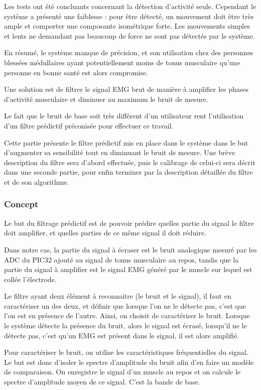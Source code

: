 \documentclass[letterpaper, twoside, 12pt, memoire, creativecommons, hyperref]{thETS}
\begin{document}
Les tests ont été concluants concernant la détection d'activité seule. Cependant le système a présenté une faiblesse : pour être détecté, un mouvement doit être très ample et comporter une composante isométrique forte. Les mouvements simples et lents ne demandant pas beaucoup de force ne sont pas détectés par le système. 

En résumé, le système manque de précision, et son utilisation chez des personnes blessées médullaires ayant potentiellement moins de tonus musculaire qu'une personne en bonne santé est alors compromise. 

Une solution est de filtrer le signal EMG brut de manière à amplifier les phases d'activité musculaire et diminuer au maximum le bruit de mesure. 

Le fait que le bruit de base soit très différent d'un utilisateur rent l'utilisation d'un filtre prédictif préconisée pour effectuer ce travail. 

Cette partie présente le filtre prédictif mis en place dans le système dans le but d'augmenter sa sensibilité tout en diminuant le bruit de mesure. Une brève description du filtre sera d'abord effectuée, puis le calibrage de celui-ci sera décrit dans une seconde partie, pour enfin terminer par la description détaillée du filtre et de son algorithme.

\subsubsection{Concept}

Le but du filtrage prédictif est de pouvoir prédire quelles partie du signal le filtre doit amplifier, et quelles parties de ce même signal il doit réduire.

Dans notre cas, la partie du signal à écraser est le bruit analogique mesuré par les ADC du PIC32 ajouté au signal de tonus musculaire au repos, tandis que la partie du signal à amplifier est le signal EMG généré par le muscle sur lequel est collée l'électrode.

Le filtre ayant deux élément à reconnaitre (le bruit et le signal), il faut en caractériser un des deux, et définir que lorsque l'on ne le détecte pas, c'est que l'on est en présence de l'autre. Ainsi, on choisit de caractériser le bruit. Lorsque le système détecte la présence du bruit, alors le signal est écrasé, lorsqu'il ne le détecte pas, c'est qu'un EMG est présent dans le signal, il est alors amplifié.

Pour caractériser le bruit, on utilise les caractéristiques fréquentielles du signal. Le but est donc d'isoler le spectre d'amplitude du bruit afin d'en faire un modèle de comparaison. On enregistre le signal d'un muscle au repos et on calcule le spectre d'amplitude moyen de ce signal. C'est la bande de base.
\end{document}
